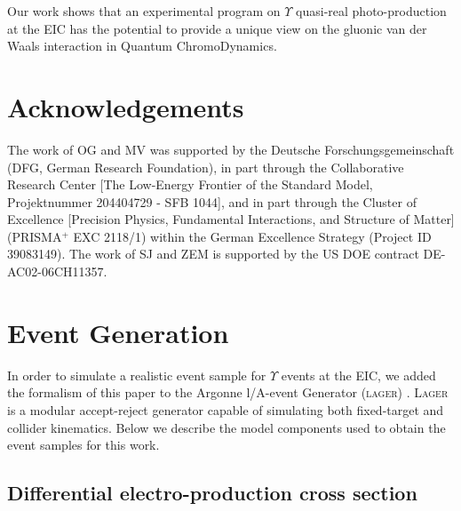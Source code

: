 \documentclass[prd,amsmath,twocolumn,floatfix,amssymb, preprintnumbers, linenumbers,nofootinbib, superscriptaddress]{revtex4}
\begin{document}
Our work shows that an experimental program on $\Upsilon$ quasi-real photo-production at the EIC has the potential to provide a unique view on the gluonic van der Waals interaction in Quantum ChromoDynamics.   




\section*{Acknowledgements}
The work of OG and MV was supported by the Deutsche Forschungsgemeinschaft (DFG, German Research Foundation),
in part through the Collaborative Research Center [The Low-Energy Frontier of the Standard
Model, Projektnummer 204404729 - SFB 1044], and in part through the Cluster of Excellence
[Precision Physics, Fundamental Interactions, and Structure of Matter] (PRISMA$^+$ EXC
2118/1) within the German Excellence Strategy (Project ID 39083149).
The work of SJ and ZEM is supported by the US DOE contract DE-AC02-06CH11357.



\appendix

\section{Event Generation\label{apx-evgen}}
In order to simulate a realistic event sample for $\Upsilon$ events at the EIC,
we added the formalism of this paper to the Argonne l/A-event Generator (\textsc{lager}) \cite{git:lager}.
\textsc{Lager} is a modular accept-reject generator capable of simulating both fixed-target and collider kinematics. Below we describe the model components used to obtain the event samples for this work.

\subsection{Differential electro-production cross section}
\end{document}
